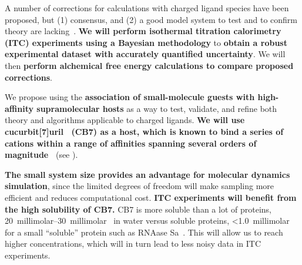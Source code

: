 \documentclass[10pt,final]{article}
\begin{document}
A number of corrections for calculations with charged ligand species have been proposed, but (1) consensus, and (2) a good model system to test and to confirm theory are lacking~\cite{Reif2013a, Rocklin2013a, Lin2014a}. \textbf{We will perform isothermal titration calorimetry (ITC) experiments  using a Bayesian methodology} to \textbf{obtain a robust experimental dataset with accurately quantified uncertainty}. We will then \textbf{ perform alchemical free energy calculations to compare proposed corrections}.

We propose using the \textbf{association of small-molecule guests with high-affinity supramolecular hosts} as a way to test, validate, and refine both theory and algorithms applicable to charged ligands. \textbf{We will use cucurbit[7]uril~\cite{Lagona2005a} (CB7) as a host, which is known to bind a series of cations within a range of affinities spanning several orders of magnitude~\cite{Cao2013a}} (see ). 

\textbf{The small system size provides an advantage for molecular dynamics simulation}, since the limited degrees of freedom will make sampling more efficient and reduces computational cost. \textbf{ITC experiments will benefit from the high solubility of CB7.} CB7 is more soluble than a lot of proteins, \SIrange{20}{30}{millimolar}~\cite{Lagona2005a} in water versus soluble proteins,  \textless \SI{1.0}{millimolar} for a small ``soluble'' protein such as RNAase Sa~\cite{Pace2004a}. This will allow us to reach higher concentrations, which will in turn lead to less noisy data in ITC experiments.
\end{document}

